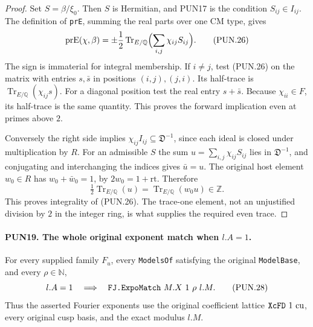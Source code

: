 \documentclass[11pt,a4paper]{article}
\numberwithin{equation}{section}
\theoremstyle{remark}\newtheorem{remark}[theorem]{Remark}
\begin{document}
\begin{proof}
Set \(S=\beta/\xi_0\).  Then \(S\) is Hermitian, and PUN17
is the condition \(S_{ij}\in I_{ij}\).  The definition of
\texttt{pr\allowbreak E}, summing the real parts over one CM type, gives
\[
 \operatorname{prE}(\chi,\beta)
       =\pm\frac12\operatorname{Tr}_{E/\mathbb Q}
                              \Bigl(\sum_{i,j}\chi_{ij}S_{ij}\Bigr).
 \tag{PUN.26}
\]
The sign is immaterial for integral membership.  If \(i\ne j\),
test (PUN.26) on the matrix with entries \(s,\bar s\) in
positions \((i,j),(j,i)\).  Its half-trace is
\(\operatorname{Tr}_{E/\mathbb Q}(\chi_{ij}s)\).
For a diagonal position test the real entry \(s+\bar s\).
Because \(\chi_{ii}\in F\), its half-trace is the same
quantity.  This proves the forward implication even at primes
above \(2\).

Conversely the right side implies
\(\chi_{ij}I_{ij}\subseteq\mathfrak D^{-1}\), since
each ideal is closed under multiplication by \(R\).
For an admissible \(S\) the sum
\(u=\sum_{i,j}\chi_{ij}S_{ij}\) lies in
\(\mathfrak D^{-1}\), and conjugating and interchanging the
indices gives \(\bar u=u\).  The original host element
\(w_0\in R\) has \(w_0+\bar w_0=1\), by
\(2w_0=1+\mathrm{rt}\).  Therefore
\[
 \tfrac12\operatorname{Tr}_{E/\mathbb Q}(u)
       =\operatorname{Tr}_{E/\mathbb Q}(w_0u)\in\mathbb Z.
 \tag{PUN.27}
\]
This proves integrality of (PUN.26).  The trace-one element,
not an unjustified division by \(2\) in the integer ring,
is what supplies the required even trace.
\end{proof}

\paragraph{PUN19. The whole original exponent match when \(l.A=1\).}
\label{claim:PUN19}
For every supplied family \(F_u\), every \texttt{Models\allowbreak Of}
satisfying the original \texttt{Model\allowbreak Base}, and every
\(\rho\in\mathbb N\),
\[
                  l.A=1\quad\Longrightarrow\quad
                         \texttt{FJ.\allowbreak Expo\allowbreak Match}\ M.X\ 1\ \rho\ l.M.
 \tag{PUN.28}
\]
Thus the asserted Fourier exponents use the original coefficient
lattice \(\texttt{Xc\allowbreak FD}\ 1\ \mathrm{cu}\), every original
cusp basis, and the exact modulus \(l.M\).
\end{document}
